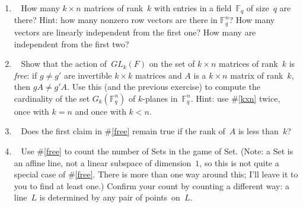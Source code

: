 \documentclass[11pt]{article}
\newcommand\score[1]{\marginpar{\vspace{-2ex}\color{blue}{#1/3}}\hspace{-1ex}}
\newcommand\0{\mathbf{0}}
\newcommand\FF{\mathbb{F}}
\newcommand\GL{\mathit{GL}}
\newcommand\<{\langle}
\renewcommand\>{\rangle}
\begin{document}
\begin{enumerate}
\item\ \score{}\label{kxn}%
How many $k \times n$ matrices of rank~$k$ with entries in a
field~$\FF_q$ of size~$q$ are there?  Hint: how many nonzero row
vectors are there in $\FF_q^n$?  How many vectors are linearly
independent from the first one?  How many are independent from the
first two?

\item\ \score{}\label{free}%
Show that the action of~$\GL_k(F)$ on the set of $k \times n$ matrices
of rank~$k$ is \emph{free}: if $g \neq g'$ are invertible $k \times k$
matrices and $A$ is a $k \times n$ matrix of rank~$k$, then $gA \neq
g'A$.  Use this (and the previous exercise) to compute the cardinality
of the set $G_k(\FF_q^n)$ of $k$-planes in~$\FF_q^n$.  Hint: use
\#\ref{kxn} twice, once with $k = n$ and once with $k < n$.

\item\ \score{}%
Does the first claim in \#\ref{free} remain true if the rank of~$A$ is
less than~$k$?

\item\ \score{}%
Use \#\ref{free} to count the number of Sets in the game of Set.
(Note: a Set is an affine line, not a linear subspace of
dimension~$1$, so this is not quite a special case of \#\ref{free}.
There is more than one way around this; I'll leave it to you to find
at least one.)  Confirm your count by counting a different way: a
line~$L$ is determined by any pair of points~on~$L$.

\end{enumerate}


\end{document}
